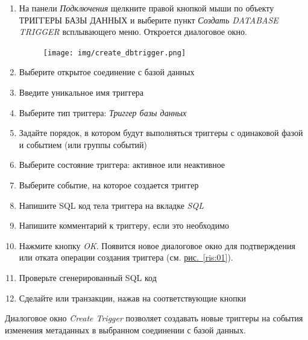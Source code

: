 \begin{enumerate}[leftmargin=26pt]
	\item  На панели \textit{Подключения} щелкните правой кнопкой мыши по объекту ТРИГГЕРЫ БАЗЫ ДАННЫХ и выберите пункт \textit{Создать DATABASE TRIGGER} всплывающего меню. Откроется диалоговое окно.
	\begin{figure}[H]
		\centering
		\texttt{[image: img/create\_dbtrigger.png]}
	\end{figure}
	\item Выберите открытое соединение с базой данных
	\item Введите уникальное имя триггера
	\item Выберите тип триггера: \textit{Триггер базы данных}
	\item Задайте порядок, в котором будут выполняться триггеры с одинаковой фазой и событием (или группы событий)
	\item Выберите состояние триггера: активное или неактивное 
	\item Выберите событие, на которое создается триггер 
	\item Напишите SQL код тела триггера на вкладке \textit{SQL} 
	\item Напишите комментарий к триггеру, если это необходимо
	\item Нажмите кнопку \textit{OK}. Появится новое диалоговое окно для подтверждения или отката операции создания триггера (см. \hyperref[ris:01]{рис.~\ref{ris:01}}).
	\item Проверьте сгенерированный SQL код 
	\item Сделайте  или  транзакции, нажав на соответствующие кнопки
\end{enumerate}	

Диалоговое окно \textit{Create Trigger} позволяет создавать новые триггеры на события изменения метаданных в выбранном соединении с базой данных.


